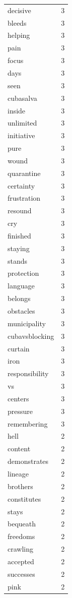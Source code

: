 \begin{tabular}{lr}
decisive & 3 \\
bleeds & 3 \\
helping & 3 \\
pain & 3 \\
focus & 3 \\
days & 3 \\
seen & 3 \\
cubasalva & 3 \\
inside & 3 \\
unlimited & 3 \\
initiative & 3 \\
pure & 3 \\
wound & 3 \\
quarantine & 3 \\
certainty & 3 \\
frustration & 3 \\
resound & 3 \\
cry & 3 \\
finished & 3 \\
staying & 3 \\
stands & 3 \\
protection & 3 \\
language & 3 \\
belongs & 3 \\
obstacles & 3 \\
municipality & 3 \\
cubavsblocking & 3 \\
curtain & 3 \\
iron & 3 \\
responsibility & 3 \\
vs & 3 \\
centers & 3 \\
pressure & 3 \\
remembering & 3 \\
hell & 2 \\
content & 2 \\
demonstrates & 2 \\
lineage & 2 \\
brothers & 2 \\
constitutes & 2 \\
stays & 2 \\
bequeath & 2 \\
freedoms & 2 \\
crawling & 2 \\
accepted & 2 \\
successes & 2 \\
pink & 2 \\

\end{tabular}
